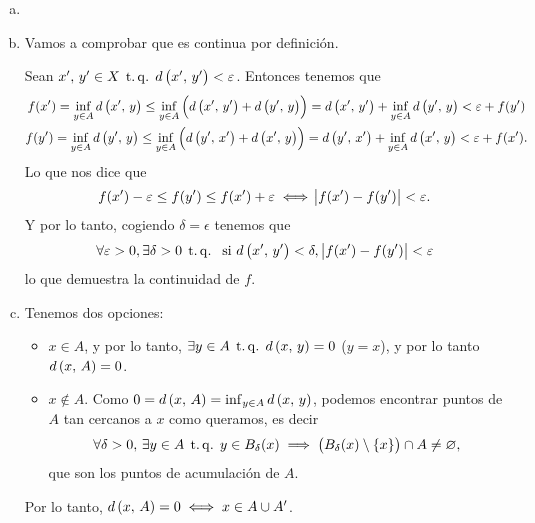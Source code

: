 \begin{eje}
  \begin{enumerate}[(a)]
        \item[]
        \item
            Vamos a comprobar que es continua por definición. 
            
            Sean $x',\,y' \in X \operatorname{\;t.q.\;} d\left( x',\,y'\right) < \varepsilon$. Entonces tenemos que
            \begin{gather*}
             f(x')= \inf_{y\in A} d\left( x',\,y\right) \leq \inf_{y\in A} \left( d\left( x',\,y'\right) + d\left( y',\,y\right) \right) = d\left( x',\,y'\right) + \inf_{y\in A} d\left( y',\,y\right) < \varepsilon + f(y') \\
             f(y')= \inf_{y\in A} d\left( y',\,y\right) \leq \inf_{y\in A} \left( d\left( y',\,x'\right) + d\left( x',\,y\right) \right) = d\left( y',\,x'\right) + \inf_{y\in A} d\left( x',\,y\right) < \varepsilon + f(x').
            \end{gather*}
            Lo que nos dice que 
            \[
             f(x')-\varepsilon \leq f(y') \leq f(x') + \varepsilon \iff \abs{f(x')-f(y')}< \varepsilon .
            \]
            Y por lo tanto, cogiendo $\delta = \epsilon$ tenemos que 
            \[
             \forall \varepsilon > 0, \exists \delta > 0 \operatorname{\;t.q.\;}  \text{ si }d\left( x',\,y'\right) < \delta,\, \abs{f(x')-f(y')} < \varepsilon 
            \]
	    lo que demuestra la continuidad de $f$.
	\item
	  Tenemos dos opciones:
	  \begin{itemize}
	    \item $x \in A$, y por lo tanto, $\exists y \in A \operatorname{\;t.q.\;} d\left( x,\, y\right) = 0$ ($y=x$), y por lo tanto $d\left( x,\,A\right) =0$.
	    \item $x \not\in A$. Como $0=d\left( x,\, A\right) = \inf_{y \in A} d\left( x,\, y\right)$, podemos encontrar puntos de $A$ tan cercanos a $x$ como queramos, es decir
	    \[
	     \forall \delta >0 ,\,  \exists y \in A \operatorname{\;t.q.\;} y \in B_{\delta}(x) \implies \left( B_{\delta}(x)\setminus \{x\}\right) \cap A \neq \varnothing , 
	    \]
	    que son los puntos de acumulación de $A$.
	  \end{itemize}
	  Por lo tanto, $d\left( x,\,A\right) =0 \iff x \in A\cup A'$.
  \end{enumerate}
\end{eje}

